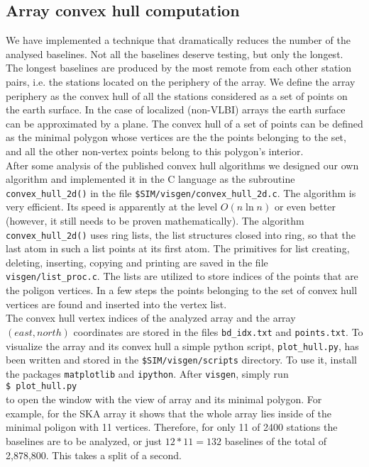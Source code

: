 \documentclass[letterpaper, oneside, 11pt]{article}
\begin{document}
\subsection{Array convex hull computation}

We have implemented a technique that dramatically reduces the number of the analysed baselines. Not all the baselines deserve testing, but only the longest. The longest baselines are produced by the most remote from each other station pairs, i.e. the stations located on the periphery of the array. We define the array periphery as the convex hull of all the stations considered as a set of points on the earth surface. In the case of localized (non-VLBI) arrays the earth surface can be approximated by a plane. The convex hull of a set of points can be defined as the minimal polygon whose vertices are the the points belonging to the set, and all the other non-vertex points belong to this polygon's interior. \\

After some analysis of the published convex hull algorithms we designed our own algorithm and implemented it in the C language as the subroutine {\tt convex\_hull\_2d()} in the file {\tt \$SIM/visgen/convex\_hull\_2d.c}. The algorithm is very efficient. Its speed is apparently at the level $O(n\ln n)$ or even better (however, it still needs to be proven mathematically). The algorithm {\tt convex\_hull\_2d()} uses ring lists, the list structures closed into ring, so that the last atom in such a list points at its first atom. The primitives for list creating, deleting, inserting, copying and printing are saved in the file {\tt visgen/list\_proc.c}. The lists are utilized to store indices of the points that are the poligon vertices. In a few steps the points belonging to the set of convex hull vertices are found and inserted into the vertex list.\\

The convex hull vertex indices of the analyzed array and the array $(east,north)$ coordinates are stored in the files {\tt bd\_idx.txt} and {\tt points.txt}. To visualize the array and its convex hull a simple python script, {\tt plot\_hull.py}, has been written and stored in the {\tt \$SIM/visgen/scripts} directory. To use it, install the packages {\tt matplotlib} and {\tt ipython}. After {\tt visgen}, simply run \\

{\tt\$ plot\_hull.py} \\

to open the window with the view of array and its minimal polygon. For example, for the SKA array it shows that the whole array lies inside of the minimal poligon with 11 vertices. Therefore, for only 11 of 2400 stations the baselines are to be analyzed, or just $12*11 = 132$ baselines of the total of 2,878,800. This takes a split of a second. \\
\end{document}
